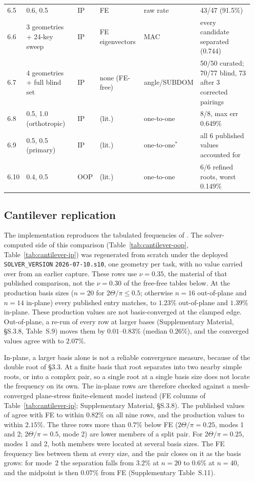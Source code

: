 \documentclass[11pt]{article}
\begin{document}
\begin{table}[!htb]
\begin{tabularx}{\linewidth}{@{}lLlllH@{}}
6.5 & 0.6, 0.5 & IP & FE & raw rate & 43/47 (91.5\%)\\
6.6 & 3 geometries + 24-key sweep & IP & FE eigenvectors & MAC & every candidate separated (0.744)\\
6.7 & 4 geometries + full blind set & IP & none (FE-free) & angle/SUBDOM & 50/50 curated; 70/77 blind, 73 after 3 corrected pairings\\
6.8 & 0.5, 1.0 (orthotropic) & IP & \cite{wangip2016} (lit.) & one-to-one & 8/8, max err 0.649\%\\
6.9 & 0.5, 0.5 (primary) & IP & \cite{qin2018} (lit.) & one-to-one$^{*}$ & all 6 published values accounted for\\
6.10 & 0.4, 0.5 & OOP & \cite{shi2014sector} (lit.) & one-to-one & 6/6 refined roots, worst 0.149\%\\
\bottomrule
\end{tabularx}
\endgroup
\end{table}

\subsection{Cantilever replication}
The implementation reproduces the tabulated frequencies of
\cite{seok1,seok2}. The solver-computed side of this comparison
(Table~\ref{tab:cantilever-oop}, Table~\ref{tab:cantilever-ip}) was
regenerated from scratch under the deployed
\texttt{SOLVER\_VERSION} \texttt{2026-07-10.s10}, one geometry per task,
with no value carried over from an earlier capture. These rows use
$\nu=0.35$, the material of that published comparison, not the
$\nu=0.30$ of the free-free tables below. At the production
basis sizes ($n=20$ for $2\Theta/\pi\le0.5$; otherwise $n=16$ out-of-plane
and $n=14$ in-plane) every published entry matches, to $1.23\%$
out-of-plane and $1.39\%$ in-plane. These production values are not
basis-converged at the clamped edge. Out-of-plane, a re-run of every row
at larger bases (Supplementary Material, §S.3.8, Table~S.9) moves them
by $0.01$--$0.83\%$ (median $0.26\%$), and the converged values
agree with \cite{seok1} to $2.07\%$.

In-plane, a larger basis alone is not a reliable convergence measure,
because of the double root of \S3.3. At a finite basis that root
separates into two nearby simple roots, or into a complex pair, so a
single root at a single basis size does not locate the frequency on its
own. The in-plane rows are
therefore checked against a mesh-converged plane-stress finite-element
model instead (FE columns of Table~\ref{tab:cantilever-ip};
Supplementary Material, §S.3.8). The published values of \cite{seok2}
agree with FE to within $0.82\%$ on all nine rows, and the production
values to within $2.15\%$. The three rows more than $0.7\%$ below FE
($2\Theta/\pi=0.25$, modes 1 and 2; $2\Theta/\pi=0.5$, mode 2) are
lower members of a split pair. For $2\Theta/\pi=0.25$, modes 1 and 2, both
members were located at several basis sizes. The FE frequency lies between
them at every size, and the pair closes on it as the basis grows: for
mode~2 the separation falls from $3.2\%$ at $n=20$ to $0.6\%$ at $n=40$,
and the midpoint is then $0.07\%$ from FE (Supplementary Table~S.11).
\end{document}
